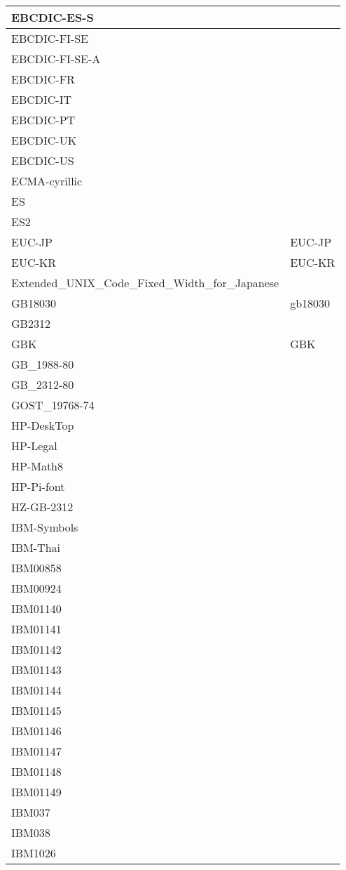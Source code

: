 \documentclass{wg21}
\begin{document}
\begin{longtable}{| p{} | p{} |}
EBCDIC-ES-S & \\ \hline
EBCDIC-FI-SE & \\ \hline
EBCDIC-FI-SE-A & \\ \hline
EBCDIC-FR & \\ \hline
EBCDIC-IT & \\ \hline
EBCDIC-PT & \\ \hline
EBCDIC-UK & \\ \hline
EBCDIC-US & \\ \hline
ECMA-cyrillic & \\ \hline
ES & \\ \hline
ES2 & \\ \hline
EUC-JP & EUC-JP\\ \hline
EUC-KR & EUC-KR\\ \hline
Extended_UNIX_Code_Fixed_Width_for_Japanese & \\ \hline
GB18030 & gb18030\\ \hline
GB2312 & \\ \hline
GBK & GBK\\ \hline
GB_1988-80 & \\ \hline
GB_2312-80 & \\ \hline
GOST_19768-74 & \\ \hline
HP-DeskTop & \\ \hline
HP-Legal & \\ \hline
HP-Math8 & \\ \hline
HP-Pi-font & \\ \hline
HZ-GB-2312 & \\ \hline
IBM-Symbols & \\ \hline
IBM-Thai & \\ \hline
IBM00858 & \\ \hline
IBM00924 & \\ \hline
IBM01140 & \\ \hline
IBM01141 & \\ \hline
IBM01142 & \\ \hline
IBM01143 & \\ \hline
IBM01144 & \\ \hline
IBM01145 & \\ \hline
IBM01146 & \\ \hline
IBM01147 & \\ \hline
IBM01148 & \\ \hline
IBM01149 & \\ \hline
IBM037 & \\ \hline
IBM038 & \\ \hline
IBM1026 & \\ \hline

\end{longtable}
\end{document}
